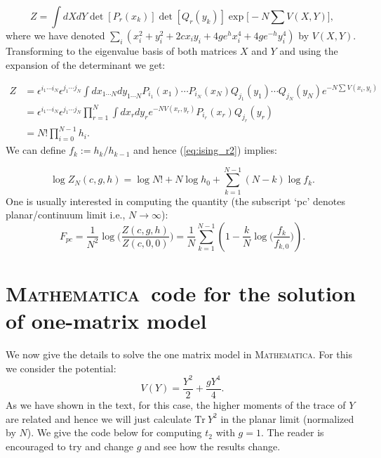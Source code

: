 \documentclass[letter,11pt]{article}
\newcommand{\MA}{\textsc{Mathematica}}
\begin{document}
\begin{equation}
	Z = \int dX dY \det[P_{r}(x_k)] \det[Q_{r}(y_k)] \exp\Big[-N \sum V(X,Y)\Big], 
\end{equation}
where we have denoted $\sum_{i} (x_{i}^2 + y_{i}^{2} +2c x_{i}y_{i} + 4ge^{h}x_{i}^{4} + 4ge^{-h}y_{i}^4)$ by $V(X,Y)$. 
Transforming to the eigenvalue basis of both matrices $X$ and $Y$ and using the expansion of the determinant we get:

\begin{align}
	Z &= \epsilon^{i_1 \cdots i_N} \epsilon^{j_1 \cdots j_N} \int dx_{1 \cdots N}
	dy_{1 \cdots N} P_{i_{1}}(x_1) \cdots P_{i_{N}}(x_N)
	Q_{j_{1}}(y_1) \cdots Q_{j_{N}}(y_N)
	e^{-N \sum V(x_i,y_i)} \nonumber  \\  
	&= \epsilon^{i_1 \cdots i_N} \epsilon^{j_1 \cdots j_N} \prod_{r=1}^{N} \int dx_{r} dy_{r} e^{-N V(x_r, y_r)} P_{i_r}(x_r) Q_{j_r}(y_r) \nonumber  \\  
	&=  N! \prod_{i=0}^{N-1} h_{i}.  
	\label{eq:ising_r2}
\end{align}
We can define $f_{k} := h_k/h_{k-1}$ and hence 
(\ref{eq:ising_r2}) implies:

\begin{equation}
	\log Z_{N}(c,g,h) = \log N! + N \log h_0 + \sum_{k=1}^{N-1} (N-k) \log f_{k} . 
\end{equation}
One is usually interested in computing the quantity (the subscript `pc' denotes planar/continuum limit i.e., $ N \to \infty$):
\begin{equation}
	F_{pc} = \frac{1}{N^2} \log\Bigg( \frac{Z(c,g,h)}{Z(c,0,0)}\Bigg) = \frac{1}{N} \sum_{k=1}^{N-1} \left(1 - \frac{k}{N} \log \Big(\frac{f_k}{f_{k,0}}\Big)\right). 
\end{equation}

\section{\label{sec:math_code}\MA~code for the solution of one-matrix model}
We now give the details to solve the one matrix model in \MA. For this we consider the potential:
\[ V(Y) = \frac{Y^2}{2} + \frac{gY^4}{4}.\]
As we have shown in the text, for this case, the higher moments of the trace of $Y$ are related and hence we will just calculate $\mbox{Tr}~Y^2$ in the planar limit (normalized by $N$). We give the code below for computing $t_{2}$ with $g=1$. The reader is encouraged to try and change $g$ and see how the results change.
\end{document}
